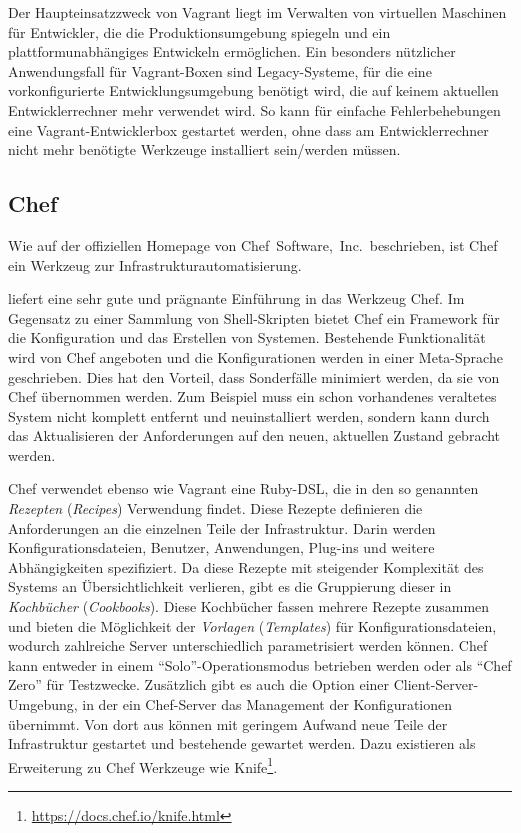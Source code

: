
Der Haupteinsatzzweck von Vagrant liegt im Verwalten von virtuellen Maschinen für Entwickler, die die Produktionsumgebung spiegeln und ein plattformunabhängiges Entwickeln ermöglichen.
Ein besonders nützlicher Anwendungsfall für Vagrant-Boxen sind Legacy-Systeme, für die eine vorkonfigurierte Entwicklungsumgebung benötigt wird, die auf keinem aktuellen Entwicklerrechner mehr verwendet wird.
So kann für einfache Fehlerbehebungen eine Vagrant-Entwicklerbox gestartet werden, ohne dass am Entwicklerrechner nicht mehr benötigte Werkzeuge installiert sein/werden müssen.


\subsection{Chef}
\label{sub:chef}
Wie auf der offiziellen Homepage \autocite{Chef:online} von Chef~Software,~Inc.\ beschrieben, ist Chef ein Werkzeug zur Infrastrukturautomatisierung.

\autocite{Wolff201604} liefert eine sehr gute und prägnante Einführung in das Werkzeug Chef.
Im Gegensatz zu einer Sammlung von Shell-Skripten bietet Chef ein Framework für die Konfiguration und das Erstellen von Systemen.
Bestehende Funktionalität wird von Chef angeboten und die Konfigurationen werden in einer Meta-Sprache geschrieben.
Dies hat den Vorteil, dass Sonderfälle minimiert werden, da sie von Chef übernommen werden. Zum Beispiel muss ein schon vorhandenes veraltetes System nicht komplett entfernt und neuinstalliert werden, sondern kann durch das Aktualisieren der Anforderungen auf den neuen, aktuellen Zustand gebracht werden.

Chef verwendet ebenso wie Vagrant eine Ruby-DSL, die in den so genannten \emph{Rezepten} (\emph{Recipes}) Verwendung findet.
Diese Rezepte definieren die Anforderungen an die einzelnen Teile der Infrastruktur. Darin werden Konfigurationsdateien, Benutzer, Anwendungen, Plug-ins und weitere Abhängigkeiten spezifiziert.
Da diese Rezepte mit steigender Komplexität des Systems an Übersichtlichkeit verlieren, gibt es die Gruppierung dieser in \emph{Kochbücher} (\emph{Cookbooks}).
Diese Kochbücher fassen mehrere Rezepte zusammen und bieten die Möglichkeit der \emph{Vorlagen} (\emph{Templates}) für Konfigurationsdateien, wodurch zahlreiche Server unterschiedlich parametrisiert werden können.
Chef kann entweder in einem "`Solo"'-Operationsmodus betrieben werden oder als "`Chef Zero"' für Testzwecke. Zusätzlich gibt es auch die Option einer Client-Server-Umgebung, in der ein Chef-Server das Management der Konfigurationen übernimmt.
Von dort aus können mit geringem Aufwand neue Teile der Infrastruktur gestartet und bestehende gewartet werden. Dazu existieren als Erweiterung zu Chef Werkzeuge wie Knife\footnote{\url{https://docs.chef.io/knife.html}}.

